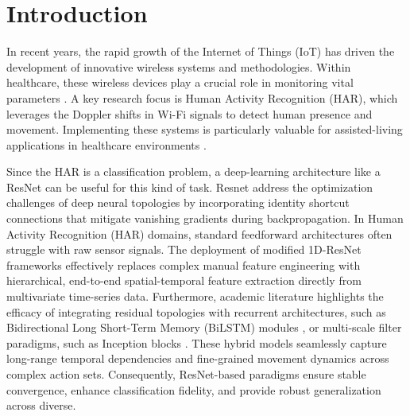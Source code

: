 
\section{Introduction}
\label{sec:introduction}

In recent years, the rapid growth of the Internet of Things (IoT) has driven the development of innovative wireless systems and methodologies. Within healthcare, these wireless devices play a crucial role in monitoring vital parameters \cite{ubibreath-2015}. A key research focus is Human Activity Recognition (HAR), which leverages the Doppler shifts in Wi-Fi signals to detect human presence and movement. Implementing these systems is particularly valuable for assisted-living applications in healthcare environments \cite{MeneghelloNN-2023}.

Since the HAR is a classification problem, a deep-learning architecture like a ResNet \cite{He-2015} can be useful for this kind of task. Resnet address the optimization challenges of deep neural topologies by incorporating identity shortcut connections that mitigate vanishing gradients during backpropagation. In Human Activity Recognition (HAR) domains, standard feedforward architectures often struggle with raw sensor signals. The deployment of modified 1D-ResNet frameworks \cite{MDPI2025} effectively replaces complex manual feature engineering with hierarchical, end-to-end spatial-temporal feature extraction directly from multivariate time-series data. Furthermore, academic literature highlights the efficacy of integrating residual topologies with recurrent architectures, such as Bidirectional Long Short-Term Memory (BiLSTM) modules \cite{MDPI2022}, or multi-scale filter paradigms, such as Inception blocks \cite{IEEE2021}. These hybrid models seamlessly capture long-range temporal dependencies and fine-grained movement dynamics across complex action sets. Consequently, ResNet-based paradigms ensure stable convergence, enhance classification fidelity, and provide robust generalization across diverse.


